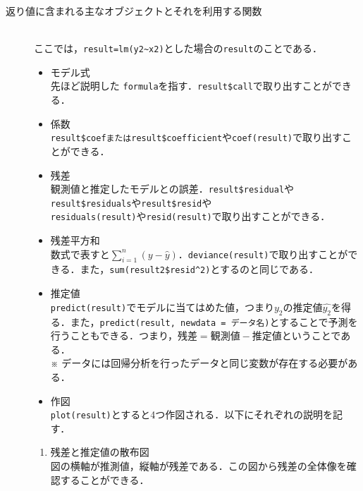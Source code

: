 \begin{description}
\item[返り値に含まれる主なオブジェクトとそれを利用する関数]\mbox{}\\
ここでは，\verb+result=lm(y2~x2)+とした場合の{\tt result}のことである．
\begin{itemize}
\item モデル式 \\
先ほど説明した {\tt formula}を指す．\verb+result$call+で取り出すことができる．
\item 係数 \\
\verb+result$coefまたは+\verb+result$coefficient+や\verb+coef(result)+で取り出すことができる．
\item 残差\\
観測値と推定したモデルとの誤差．\verb+result$residual+や\verb+result$residuals+や\verb+result$resid+や\\
\verb+residuals(result)+や\verb+resid(result)+で取り出すことができる．
\item 残差平方和\\
数式で表すと$\sum \limits ^n _{i=1} \left( y-\hat{y} \right)$．\verb+deviance(result)+で取り出すことができる．また，\verb+sum(result2$resid^2)+とするのと同じである．
\item 推定値\\
\verb+predict(result)+でモデルに当てはめた値，つまり$y_2$の推定値$\hat{y_2}$を得る．また，\verb+predict(result, newdata = データ名)+とすることで予測を行うこともできる．つまり，$\mbox{残差}=\mbox{観測値}-\mbox{推定値}$ということである．\\
※ データには回帰分析を行ったデータと同じ変数が存在する必要がある．
\item 作図\\
\verb+plot(result)+とすると4つ作図される．以下にそれぞれの説明を記す．
\end{itemize}
\begin{indentation}{3em}{0pt}
\begin{enumerate}
\item 残差と推定値の散布図\\
図の横軸が推測値，縦軸が残差である．この図から残差の全体像を確認することができる．
\begin{center}

\end{center}
\end{enumerate}
\end{indentation}
\end{description}
